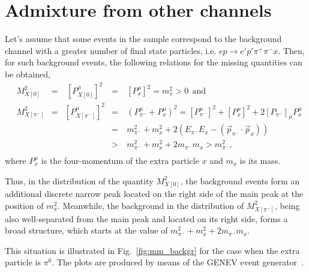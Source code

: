 \section{Admixture from other channels}
\mbox{}\vspace{-\baselineskip}



Let's assume that some events in the sample correspond to the background channel with a greater number of final state particles, i.e. $ep\rightarrow e'p'\pi^{+}\pi^{-}x$. Then, for such background events, the following relations for the missing quantities can be obtained,
\begin{equation}
\begin{aligned}
&M_{X[0]}^{2}&=&~\left [P_{X[0]}^{\mu} \right ]^{2}&=&~[P^{\mu}_{x}]^{2} = m_{x}^{2} >0~~\textrm{and}\\
&M_{X[\pi^{-}]}^{2}&=&\left [P_{X[\pi^{-}]}^{\mu}\right ]^{2}&=&~(P_{\pi^{-}}^{\mu}+P^{\mu}_{x})^{2}=[P^{\mu}_{\pi^{-}}]^{2} +[P^{\mu}_{x}]^{2}+2\left [P_{\pi^{-}}\right ]_{\mu} P_{x}^{\mu} \\
&&&&=&~m_{\pi^{-}}^{2} + m_{x}^{2} +2(E_{\pi^{-}}E_{x} - (\overrightarrow{p}_{\pi^{-}}\cdot \overrightarrow{p}_{x}))  \\
&&&&>&~m_{\pi^{-}}^{2} + m_{x}^{2}+2m_{\pi^{-}}m_{x} > m_{\pi^{-}}^{2},\\
\end{aligned}\label{eq:mm_other_ch}
\end{equation}
where $P^{\mu}_{x}$ is the four-momentum of the extra particle $x$ and $m_{x}$ is its mass.




Thus, in the distribution of the quantity $M_{X[0]}^{2}$, the background events form an additional discrete narrow peak located on the right side of the main peak at the position of $m_{x}^{2}$. Meanwhile, the background in the distribution of $M_{X[\pi^{-}]}^{2}$, being also well-separated from the main peak and located on its right side, forms a broad structure, which starts at the value of $m_{\pi^{-}}^{2} + m_{x}^{2}+2m_{\pi^{-}}m_{x}$.



This situation is illustrated in Fig.~\ref{fig:mm_backgr} for the case when the extra particle is $\pi^{0}$. The plots are produced by means of the GENEV event generator~\cite{Genev}.



